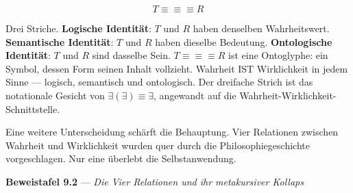 \documentclass[10pt, openany, oneside]{book}
\begin{document}
$$T \equiv\!\equiv\!\equiv R$$

Drei Striche. \textbf{Logische Identität}: $T$ und $R$ haben denselben Wahrheitswert. \textbf{Semantische Identität}: $T$ und $R$ haben dieselbe Bedeutung. \textbf{Ontologische Identität}: $T$ und $R$ sind dasselbe Sein. $T \equiv\!\equiv\!\equiv R$ ist eine Ontoglyphe: ein Symbol, dessen Form seinen Inhalt vollzieht. Wahrheit IST Wirklichkeit in jedem Sinne --- logisch, semantisch und ontologisch. Der dreifache Strich ist das notationale Gesicht von $\exists(\exists) \equiv \exists$, angewandt auf die Wahrheit-Wirklichkeit-Schnittstelle.

Eine weitere Unterscheidung schärft die Behauptung. Vier Relationen zwischen Wahrheit und Wirklichkeit wurden quer durch die Philosophiegeschichte vorgeschlagen. Nur eine überlebt die Selbstanwendung.

\vspace{0.5em}

\textbf{Beweistafel 9.2} --- \textit{Die Vier Relationen und ihr metakursiver Kollaps}

\vspace{0.5em}
\end{document}
